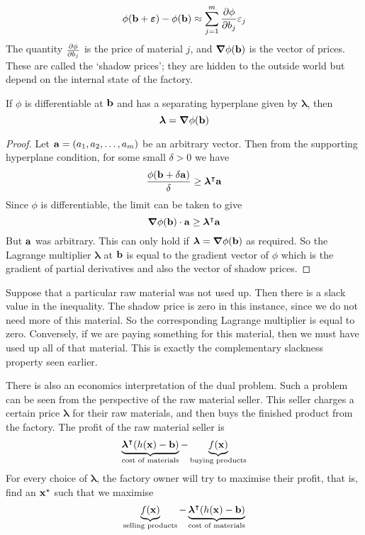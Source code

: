 \[
	\phi(\vb b + \bm\varepsilon) - \phi(\vb b) \approx \sum_{j=1}^m \pdv{\phi}{b_j}(\vb b) \varepsilon_j
\]
The quantity \( \pdv{\phi}{b_j}(\vb b) \) is the price of material \( j \), and \( \grad \phi(\vb b) \) is the vector of prices.
These are called the `shadow prices'; they are hidden to the outside world but depend on the internal state of the factory.

\begin{theorem}
	If \( \phi \) is differentiable at \( \vb b \) and has a separating hyperplane given by \( \bm \lambda \), then
	\[
		\bm \lambda = \grad{\phi}(\vb b)
	\]
\end{theorem}
\begin{proof}
	Let \( \vb a = (a_1, a_2, \dots, a_m) \) be an arbitrary vector.
	Then from the supporting hyperplane condition, for some small \( \delta > 0 \) we have
	\[
		\frac{\phi(\vb b + \delta\vb a)}{\delta} \geq \bm \lambda^\intercal \vb a
	\]
	Since \( \phi \) is differentiable, the limit can be taken to give
	\[
		\grad{\phi}(\vb b) \cdot \vb a \geq \bm \lambda^\intercal \vb a
	\]
	But \( \vb a \) was arbitrary.
	This can only hold if \( \bm \lambda = \grad{\phi}(\vb b) \) as required.
	So the Lagrange multiplier \( \bm \lambda \) at \( \vb b \) is equal to the gradient vector of \( \phi \) which is the gradient of partial derivatives and also the vector of shadow prices.
\end{proof}

\noindent Suppose that a particular raw material was not used up.
Then there is a slack value in the inequality.
The shadow price is zero in this instance, since we do not need more of this material.
So the corresponding Lagrange multiplier is equal to zero.
Conversely, if we are paying something for this material, then we must have used up all of that material.
This is exactly the complementary slackness property seen earlier.

There is also an economics interpretation of the dual problem.
Such a problem can be seen from the perspective of the raw material seller.
This seller charges a certain price \( \bm \lambda \) for their raw materials, and then buys the finished product from the factory.
The profit of the raw material seller is
\[
	\underbrace{\bm\lambda^\intercal (h(\vb x) - \vb b)}_{\text{cost of materials}} - \underbrace{f(\vb x)}_{\text{buying products}}
\]
For every choice of \( \bm\lambda \), the factory owner will try to maximise their profit, that is, find an \( \vb x^\star \) such that we maximise
\[
	\underbrace{f(\vb x)}_{\text{selling products}} - \underbrace{\bm\lambda^\intercal (h(\vb x) - \vb b)}_{\text{cost of materials}}
\]
